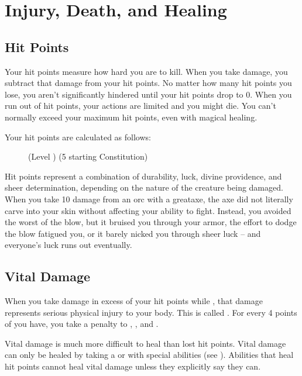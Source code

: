 \section{Injury, Death, and Healing}\label{Injury, Death, and Healing}

    \subsection{Hit Points}\label{Hit Points}
        Your hit points measure how hard you are to kill.
        When you take damage, you subtract that damage from your hit points.
        No matter how many hit points you lose, you aren't significantly hindered until your hit points drop to 0.
        When you run out of hit points, your actions are limited and you might die.
        You can't normally exceed your maximum hit points, even with magical healing.

        Your hit points are calculated as follows:

        \begin{figure}[h]
            \centering (Level ) \x (5 \add starting Constitution)
        \end{figure}

         Hit points represent a combination of durability, luck, divine providence, and sheer determination, depending on the nature of the creature being damaged.
        When you take 10 damage from an orc with a greataxe, the axe did not literally carve into your skin without affecting your ability to fight.
        Instead, you avoided the worst of the blow, but it bruised you through your armor, the effort to dodge the blow fatigued you, or it barely nicked you through sheer luck -- and everyone's luck runs out eventually.

    \subsection{Vital Damage}\label{Vital Damage}
        When you take damage in excess of your hit points while , that damage represents serious physical injury to your body.
        This is called .
        For every 4 points of  you have, you take a  penalty to , , and .

         Vital damage is much more difficult to heal than lost hit points.
        Vital damage can only be healed by taking a  or with special abilities (see ).
        Abilities that heal hit points cannot heal vital damage unless they explicitly say they can.

